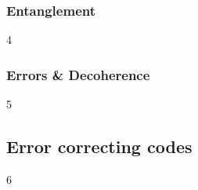 \subsubsection{Entanglement}
4 
\subsubsection{Errors \& Decoherence}
5 
\subsection{Error correcting codes}
6
\subsection{}
